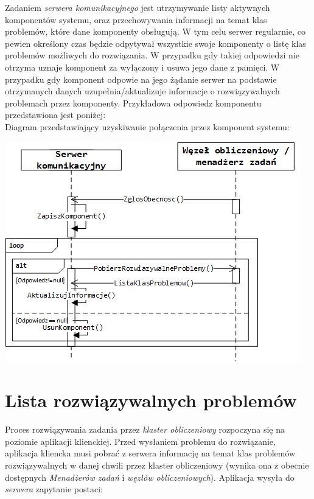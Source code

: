 \documentclass[12pt,a4paper,titlepage]{report}
\begin{document}
	Zadaniem \textit{serwera komunikacyjnego} jest utrzymywanie listy aktywnych komponentów systemu, oraz przechowywania informacji na temat klas problemów, które dane komponenty obsługują. W tym celu serwer regularnie, co pewien określony czas
będzie odpytywał wszystkie swoje komponenty o listę klas problemów możliwych do rozwiązania. W przypadku gdy takiej odpowiedzi nie otrzyma uznaje komponent za wyłączony i usuwa jego dane z pamięci. W przypadku gdy komponent odpowie na jego żądanie serwer 
na podstawie otrzymanych danych uzupełnia/aktualizuje informacje o rozwiązywalnych problemach przez komponenty. 
Przykładowa odpowiedz komponentu przedstawiona jest poniżej: \\
	 
	 

	Diagram przedstawiający uzyskiwanie połączenia przez komponent systemu:
	
		\includegraphics[width=\textwidth]{img/communication/connecting.png}	
	
	\section{Lista rozwiązywalnych problemów}
	Proces rozwiązywania zadania przez \textit{klaster obliczeniowy} rozpoczyna się na poziomie aplikacji klienckiej. Przed
	wysłaniem problemu do rozwiązanie, aplikacja kliencka musi pobrać z serwera informację na temat klas problemów
	rozwiązywalnych w danej chwili przez klaster obliczeniowy (wynika ona z obecnie dostępnych \textit{Menadżerów zadań} i \textit{węzłów obliczeniowych}). Aplikacja wysyła do \textit{serwera} zapytanie postaci: \\
	
\end{document}
